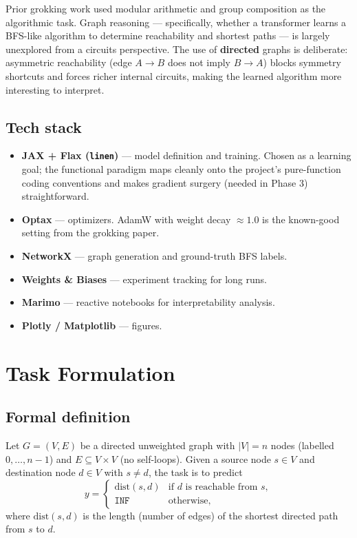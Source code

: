 \documentclass[11pt, a4paper]{article}
\begin{document}
Prior grokking work used modular arithmetic and group composition as the
algorithmic task. Graph reasoning --- specifically, whether a transformer
learns a BFS-like algorithm to determine reachability and shortest paths
--- is largely unexplored from a circuits perspective. The use of
\textbf{directed} graphs is deliberate: asymmetric reachability
(edge $A \to B$ does not imply $B \to A$) blocks symmetry shortcuts and
forces richer internal circuits, making the learned algorithm more
interesting to interpret.

\subsection{Tech stack}

\begin{itemize}[noitemsep]
  \item \textbf{JAX + Flax (\texttt{linen})} --- model definition and training.
        Chosen as a learning goal; the functional paradigm maps cleanly onto
        the project's pure-function coding conventions and makes gradient
        surgery (needed in Phase 3) straightforward.
  \item \textbf{Optax} --- optimizers. AdamW with weight decay $\approx 1.0$
        is the known-good setting from the grokking paper.
  \item \textbf{NetworkX} --- graph generation and ground-truth BFS labels.
  \item \textbf{Weights \& Biases} --- experiment tracking for long runs.
  \item \textbf{Marimo} --- reactive notebooks for interpretability analysis.
  \item \textbf{Plotly / Matplotlib} --- figures.
\end{itemize}

\section{Task Formulation}

\subsection{Formal definition}

Let $G = (V, E)$ be a directed unweighted graph with $|V| = n$ nodes
(labelled $0, \ldots, n-1$) and $E \subseteq V \times V$ (no self-loops).
Given a source node $s \in V$ and destination node $d \in V$ with $s \neq d$,
the task is to predict
\[
  y = \begin{cases}
    \text{dist}(s, d) & \text{if } d \text{ is reachable from } s, \\
    \texttt{INF}      & \text{otherwise,}
  \end{cases}
\]
where $\text{dist}(s, d)$ is the length (number of edges) of the shortest
directed path from $s$ to $d$.
\end{document}
